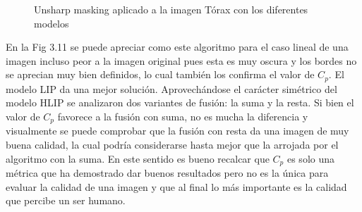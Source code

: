 \begin{figure}
\begin{center}
		\caption{Unsharp masking aplicado a la imagen T\'orax con los diferentes modelos}
	\end{center}
\end{figure}

En la Fig 3.11 se puede apreciar como este algoritmo para el caso lineal de una imagen incluso peor a la imagen original pues esta es muy oscura y los bordes no se aprecian muy bien definidos, lo cual tambi\'en los confirma el valor de $C_p$. El modelo LIP da una mejor soluci\'on. Aprovech\'andose el car\'acter sim\'etrico del modelo HLIP se analizaron dos variantes de fusi\'on: la suma y la resta. Si bien el valor de $C_p$ favorece a la fusi\'on con suma, no es mucha la diferencia y visualmente se puede comprobar que la fusi\'on con resta da una imagen de muy buena calidad, la cual podr\'ia considerarse hasta mejor que la arrojada por el algoritmo con la suma. En este sentido es bueno recalcar que $C_p$ es solo una m\'etrica que ha demostrado dar buenos resultados pero no es la \'unica para evaluar la calidad de una imagen y que al final lo m\'as importante es la calidad que percibe un ser humano.

